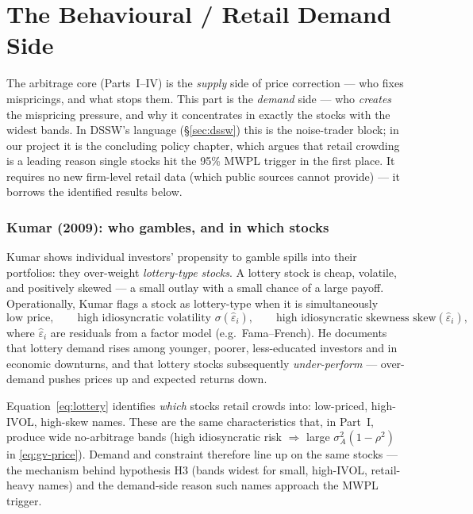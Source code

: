 \part{The Behavioural / Retail Demand Side}
\label{part:behavioural}

The arbitrage core (Parts~I--IV) is the \emph{supply} side of price correction --- who fixes mispricings, and what stops them. This part is the \emph{demand} side --- who \emph{creates} the mispricing pressure, and why it concentrates in exactly the stocks with the widest bands. In DSSW's language (\S\ref{sec:dssw}) this is the noise-trader block; in our project it is the concluding policy chapter, which argues that retail crowding is a leading reason single stocks hit the 95\% MWPL trigger in the first place. It requires no new firm-level retail data (which public sources cannot provide) --- it borrows the identified results below.

\section{Kumar (2009): who gambles, and in which stocks}
\label{sec:kumar}
Kumar shows individual investors' propensity to gamble spills into their portfolios: they over-weight \emph{lottery-type stocks}. A lottery stock is cheap, volatile, and positively skewed --- a small outlay with a small chance of a large payoff. Operationally, Kumar flags a stock as lottery-type when it is simultaneously
\begin{equation}
\text{low price}, \qquad \text{high idiosyncratic volatility } \sigma(\hat\varepsilon_i), \qquad \text{high idiosyncratic skewness } \mathrm{skew}(\hat\varepsilon_i), \label{eq:lottery}
\end{equation}
where $\hat\varepsilon_i$ are residuals from a factor model (e.g.\ Fama--French). He documents that lottery demand rises among younger, poorer, less-educated investors and in economic downturns, and that lottery stocks subsequently \emph{under-perform} --- over-demand pushes prices up and expected returns down.

\begin{takeaway}
Equation~\eqref{eq:lottery} identifies \emph{which} stocks retail crowds into: low-priced, high-IVOL, high-skew names. These are the same characteristics that, in Part~I, produce wide no-arbitrage bands (high idiosyncratic risk $\Rightarrow$ large $\sigma_A^2(1-\rho^2)$ in \eqref{eq:gv-price}). Demand and constraint therefore line up on the same stocks --- the mechanism behind hypothesis H3 (bands widest for small, high-IVOL, retail-heavy names) and the demand-side reason such names approach the MWPL trigger.
\end{takeaway}

